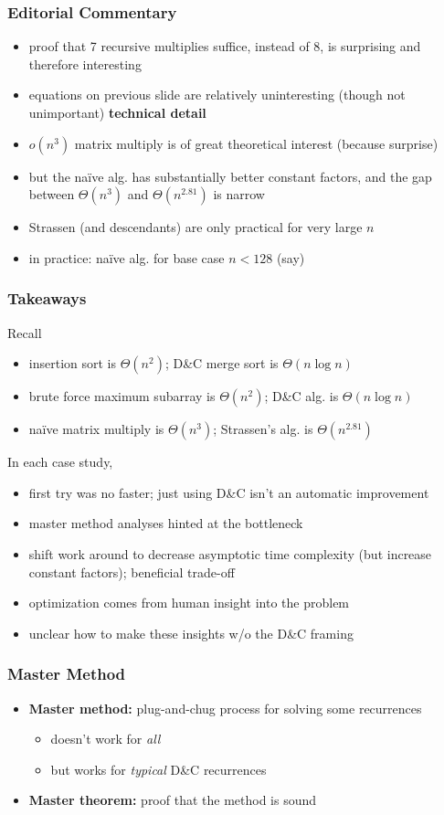 \documentclass{beamer}
\begin{document}
\begin{frame} \frametitle{Editorial Commentary}
\begin{itemize}
  \item proof that 7 recursive multiplies suffice, instead of 8, is surprising
    and therefore interesting
  \item equations on previous slide are relatively uninteresting (though not
    unimportant) \textbf{technical detail}
  \item $o(n^3)$ matrix multiply is of great theoretical interest (because
    surprise)
  \item but the na\"ive alg. has substantially better constant factors, and
    the gap between $\Theta(n^3)$ and $\Theta(n^{2.81})$ is narrow
  \item Strassen (and descendants) are only practical for very large $n$
  \item in practice: na\"ive alg. for base case $n<128$ (say)
\end{itemize}
\end{frame}

\begin{frame} \frametitle{Takeaways}
Recall
\begin{itemize}
  \item insertion sort is $\Theta(n^2)$; D\&C merge sort is $\Theta(n \log n)$
  \item brute force maximum subarray is $\Theta(n^2)$; D\&C alg. is $\Theta(n \log n)$
  \item na\"ive matrix multiply is $\Theta(n^3)$; Strassen's alg. is $\Theta(n^{2.81})$
\end{itemize}
In each case study,
\begin{itemize}
  \item first try was no faster; just using D\&C isn't an automatic improvement
  \item master method analyses hinted at the bottleneck
  \item shift work around to decrease asymptotic time complexity (but increase
    constant factors); beneficial trade-off
  \item optimization comes from human insight into the problem
  \item unclear how to make these insights w/o the D\&C framing
\end{itemize}
\end{frame}

\begin{frame} \frametitle{Master Method}
  \begin{itemize}
    \item \textbf{Master method:} plug-and-chug process for solving some recurrences
    \begin{itemize}
      \item doesn't work for \emph{all}
      \item but works for \emph{typical} D\&C recurrences
    \end{itemize}
  \item \textbf{Master theorem:} proof that the method is sound
  \end{itemize}
\end{frame}
\end{document}
